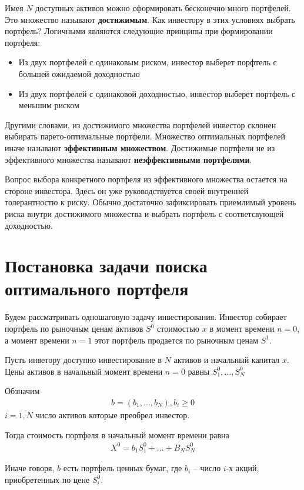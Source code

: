 Имея $N$ доступных активов можно сформировать бесконечно много портфелей. Это множество называют \textbf{достижимым}. 
Как инвестору в этих условиях выбрать портфель? Логичными являются следующие принципы при формировании портфеля:
\begin{itemize}
	\item Из двух портфелей с одинаковым риском, инвестор выберет порфтель с большей ожидаемой доходностью
	\item Из двух портфелей с одинаковой доходностью, инвестор выберет портфель с меньшим риском
\end{itemize}
Другими словами, из достижимого множества портфелей инвестор склонен выбирать парето-оптимальные портфели.
Множество оптимальных портфелей иначе называют \textbf{эффективным множеством}. Достижимые портфели не из 
эффективного множества называют \textbf{неэффективными портфелями}.

Вопрос выбора конкретного портфеля из эффективного множества остается на стороне инвестора. Здесь он уже руководствуется
своей внутренней толерантностю к риску. Обычно достаточно зафиксировать приемлимый уровень риска внутри достижимого множества
и выбрать портфель с соответсвующей доходностью. 


\section{Постановка задачи поиска оптимального портфеля}

Будем рассматривать одношаговую задачу инвестирования. Инвестор собирает портфель по рыночным ценам активов $S^0$
стоимостью $x$ в момент времени $n=0$, а момент времени $n=1$ этот портфель продается по рыночным ценам $S^1$.

Пусть инветору доступно инвестирование в $N$ активов и начальный капитал $x$. 
Цены активов в начальный момент времени $n=0$ равны
$S_1^0, \dots, S_N^0$

Обзначим 
\begin{align}
	b = (b_1, \dots, b_N), b_i \ge 0
\end{align}
$i=\overline{1, N}$ число активов которые преобрел инвестор.

Тогда стоимость портфеля в начальный момент времени равна
\begin{align}
	X^0 = b_1 S_1^0 + \dots + B_N S_N^0
\end{align}

Иначе говоря, $b$ есть портфель ценных бумаг, где $b_i$ -- число $i$-х акций, приобретенных по цене $S_i^0$.

